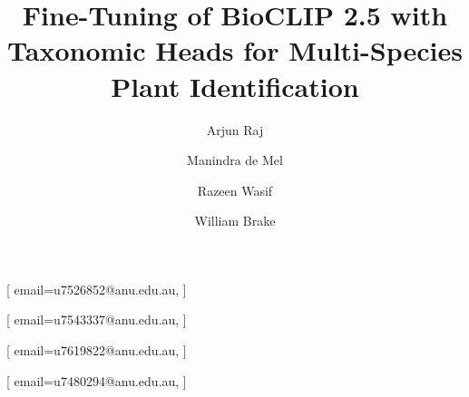 


\title{Fine-Tuning of BioCLIP 2.5 with Taxonomic Heads for Multi-Species Plant Identification}

\author[1]{Arjun Raj}[%
  email=u7526852@anu.edu.au,
]
\fnmark[1]

\address[1]{The Australian National University, Canberra, ACT 2601, Australia}

\author[1]{Manindra de Mel}[%
  email=u7543337@anu.edu.au,
]
\cormark[1]
\fnmark[1]

\author[1]{Razeen Wasif}[%
  email=u7619822@anu.edu.au,
]
\fnmark[1]

\author[1]{William Brake}[%
  email=u7480294@anu.edu.au,
]
\fnmark[1]


